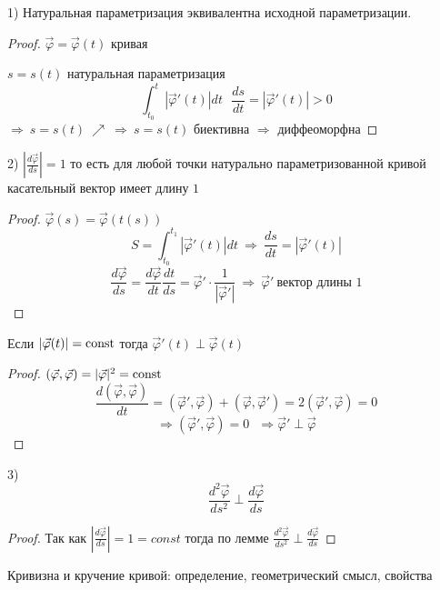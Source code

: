 \begin{block}[Свойства]
  1) Натуральная параметризация эквивалентна исходной параметризации.

  \begin{proof}
    $\vec \varphi = \vec \varphi(t)$ кривая

    $s = s(t)$ натуральная параметризация
    $$
    \int_{t_0}^{t} |\vec \varphi'(t)| dt ~~~
    \frac{ds}{dt} = |\vec \varphi'(t)| > 0
    $$
    $\Rightarrow ~ s = s(t) ~ \nearrow ~ \Rightarrow ~ s = s(t)$ биективна
    $\Rightarrow$ диффеоморфна
  \end{proof}

  2) $\left| \frac{d \vec \varphi}{ds} \right| = 1$ то есть для любой точки
  натурально параметризованной кривой касательный вектор имеет длину $1$

  \begin{proof}
    $\vec \varphi(s) = \vec \varphi (t(s))$
    $$
    S = \int_{t_0}^{t_1} |\vec \varphi'(t)| dt ~ \Rightarrow ~ \frac{ds}{dt} =
    |\vec \varphi'(t)|
    $$
    $$
    \frac{d\vec \varphi}{ds} = \frac{d \vec \varphi}{dt} \frac{dt}{ds} =
    \vec \varphi' \cdot \frac{1}{|\vec \varphi'|} ~ \Rightarrow ~ \vec \varphi'
    ~ \text{вектор длины 1}
    $$
  \end{proof}

  \begin{block}[Лемма]
    Если $|\vec \varphi(t)| = \mathrm{const}$ тогда $\vec \varphi'(t) \perp
    \vec \varphi(t)$
  \end{block}

  \begin{proof}
    $(\vec \varphi, \vec \varphi) = |\vec \varphi|^2 = \mathrm{const}$
    $$
    \frac{d(\vec \varphi, \vec \varphi)}{dt} = (\vec \varphi', \vec \varphi) +
    (\vec \varphi, \vec \varphi') = 2(\vec \varphi', \vec \varphi) = 0
    $$
    $$
    \Rightarrow (\vec \varphi', \vec \varphi) = 0 ~~~ \Rightarrow \vec \varphi'
    \perp \vec \varphi
    $$
  \end{proof}

  3)
  $$
  \frac{d^2 \vec \varphi}{ds^2} \perp \frac{d\vec \varphi}{ds}
  $$
  \begin{proof}
    Так как $\left| \frac{d\vec \varphi}{ds} \right| = 1 = const$ тогда
    по лемме $\frac{d^2 \vec \varphi}{ds^2} \perp \frac{d\vec \varphi}{ds}$
  \end{proof}
\end{block}

\begin{title}[\Large]
  Кривизна и кручение кривой: определение, геометрический смысл, свойства
\end{title}

